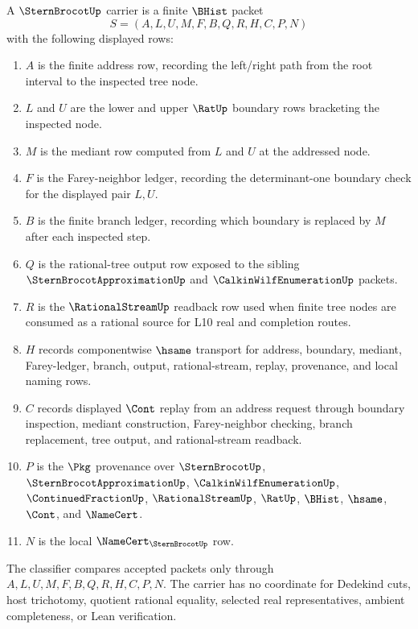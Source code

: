 \begin{definition}
\label{def:stern-brocot-carrier}
A $\SternBrocotUp$ carrier is a finite $\BHist$ packet
$$
S=(A,L,U,M,F,B,Q,R,H,C,P,N)
$$
with the following displayed rows:
\begin{enumerate}
\item $A$ is the finite address row, recording the left/right path from the root interval to the inspected tree node.
\item $L$ and $U$ are the lower and upper $\RatUp$ boundary rows bracketing the inspected node.
\item $M$ is the mediant row computed from $L$ and $U$ at the addressed node.
\item $F$ is the Farey-neighbor ledger, recording the determinant-one boundary check for the displayed pair $L,U$.
\item $B$ is the finite branch ledger, recording which boundary is replaced by $M$ after each inspected step.
\item $Q$ is the rational-tree output row exposed to the sibling $\SternBrocotApproximationUp$ and $\CalkinWilfEnumerationUp$ packets.
\item $R$ is the $\RationalStreamUp$ readback row used when finite tree nodes are consumed as a rational source for L10 real and completion routes.
\item $H$ records componentwise $\hsame$ transport for address, boundary, mediant, Farey-ledger, branch, output, rational-stream, replay, provenance, and local naming rows.
\item $C$ records displayed $\Cont$ replay from an address request through boundary inspection, mediant construction, Farey-neighbor checking, branch replacement, tree output, and rational-stream readback.
\item $P$ is the $\Pkg$ provenance over $\SternBrocotUp$, $\SternBrocotApproximationUp$, $\CalkinWilfEnumerationUp$, $\ContinuedFractionUp$, $\RationalStreamUp$, $\RatUp$, $\BHist$, $\hsame$, $\Cont$, and $\NameCert$.
\item $N$ is the local $\NameCert_{\SternBrocotUp}$ row.
\end{enumerate}
The classifier compares accepted packets only through $A,L,U,M,F,B,Q,R,H,C,P,N$. The carrier has no coordinate for Dedekind cuts, host trichotomy, quotient rational equality, selected real representatives, ambient completeness, or Lean verification.
\end{definition}

